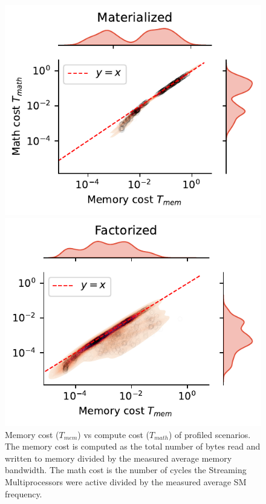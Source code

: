 \begin{figure}[ht]
    \centering
    \begin{minipage}{0.50\textwidth}
        \includegraphics[width=\linewidth]{chapters/05_cost_estimation/figures/profiling-mem-vs-compute-materialized.pdf}
    \end{minipage}\hfill
    \begin{minipage}{0.50\textwidth}
        \includegraphics[width=\linewidth]{chapters/05_cost_estimation/figures/profiling-mem-vs-compute-factorized.pdf}
    \end{minipage}
    \caption[Memory cost vs math cost of profiled scenarios]{Memory cost ($T_{mem}$) vs compute cost ($T_{math}$) of profiled scenarios. The memory cost is computed as the total number of bytes read and written to memory divided by the measured average memory bandwidth. The math cost is the number of cycles the Streaming Multiprocessors were active divided by the measured average SM frequency.}
    \label{fig:5-profiling-mem-vs-compute}
\end{figure}

